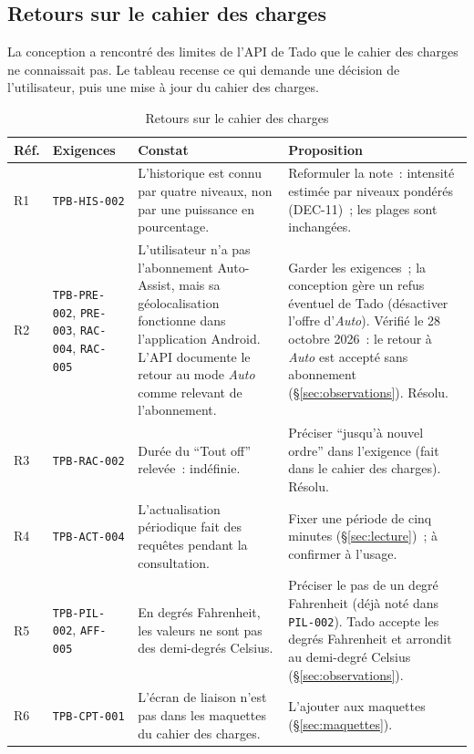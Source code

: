 \subsection{Retours sur le cahier des charges}
\label{sec:retours}

La conception a rencontré des limites de l'API de Tado que le cahier des charges ne
connaissait pas. Le tableau recense ce qui demande une décision de l'utilisateur, puis une
mise à jour du cahier des charges.


\begin{table}[H]
  \centering\small
  \begin{tabularx}{\linewidth}{@{}l>{\raggedright\arraybackslash}p{26mm}>{\raggedright\arraybackslash}p{50mm}X@{}}
    \toprule
    \textbf{Réf.} & \textbf{Exigences} & \textbf{Constat} & \textbf{Proposition} \\
    \midrule
    R1 & \texttt{TPB-HIS-002} & L'historique est connu par quatre niveaux, non par une puissance en pourcentage. & Reformuler la note~: intensité estimée par niveaux pondérés (DEC-11)~; les plages sont inchangées. \\
    R2 & \texttt{TPB-PRE-002}, \texttt{PRE-003}, \texttt{RAC-004}, \texttt{RAC-005} & L'utilisateur n'a pas l'abonnement Auto-Assist, mais sa géolocalisation fonctionne dans l'application Android. L'API documente le retour au mode \emph{Auto} comme relevant de l'abonnement. & Garder les exigences~; la conception gère un refus éventuel de Tado (désactiver l'offre d'\emph{Auto}). Vérifié le 28 octobre 2026~: le retour à \emph{Auto} est accepté sans abonnement (§\ref{sec:observations}). Résolu. \\
    R3 & \texttt{TPB-RAC-002} & Durée du \enquote{Tout off} relevée~: indéfinie. & Préciser \enquote{jusqu'à nouvel ordre} dans l'exigence (fait dans le cahier des charges). Résolu. \\
    R4 & \texttt{TPB-ACT-004} & L'actualisation périodique fait des requêtes pendant la consultation. & Fixer une période de cinq minutes (§\ref{sec:lecture})~; à confirmer à l'usage. \\
    R5 & \texttt{TPB-PIL-002}, \texttt{AFF-005} & En degrés Fahrenheit, les valeurs ne sont pas des demi-degrés Celsius. & Préciser le pas de un degré Fahrenheit (déjà noté dans \texttt{PIL-002}). Tado accepte les degrés Fahrenheit et arrondit au demi-degré Celsius (§\ref{sec:observations}). \\
    R6 & \texttt{TPB-CPT-001} & L'écran de liaison n'est pas dans les maquettes du cahier des charges. & L'ajouter aux maquettes (§\ref{sec:maquettes}). \\
    \bottomrule
  \end{tabularx}
  \caption{Retours sur le cahier des charges}
\end{table}
